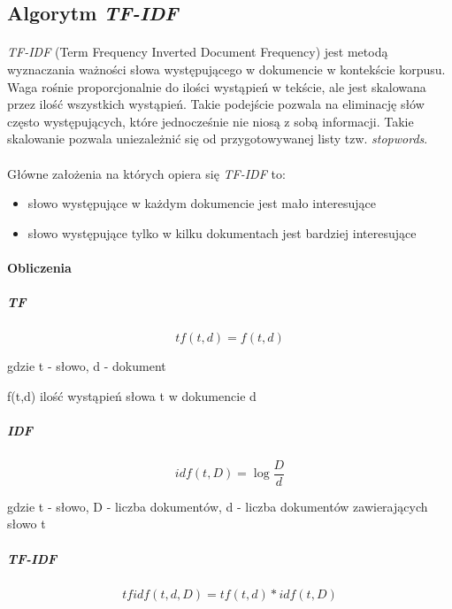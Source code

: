 \documentclass[a4paper,12pt]{article}
\begin{document}
\subsection{Algorytm \textit{TF-IDF}}

\paragraph{}

\textit{TF-IDF} (Term Frequency Inverted Document Frequency) jest metodą wyznaczania ważności słowa występującego w dokumencie w kontekście korpusu. Waga rośnie proporcjonalnie do ilości wystąpień w tekście, ale jest skalowana przez ilość wszystkich wystąpień. Takie podejście pozwala na eliminację słów często występujących, które jednocześnie nie niosą z sobą informacji. Takie skalowanie pozwala uniezależnić się od przygotowywanej listy tzw. \textit{stopwords}.

\paragraph{}
Główne założenia na których opiera się \textit{TF-IDF} to:

\begin{itemize}
 \item słowo występujące w każdym dokumencie jest mało interesujące
 \item słowo występujące tylko w kilku dokumentach jest bardziej interesujące
\end{itemize}

\paragraph{Obliczenia} 

\subparagraph{TF}
\begin{equation}
  tf(t,d)=f(t,d)  
\end{equation}

gdzie t - słowo,  
d - dokument

f(t,d) ilość wystąpień słowa t w dokumencie d

\subparagraph{IDF}
\begin{equation}
idf(t,D)=\log \frac{D}{d}
\end{equation}

gdzie t - słowo, D - liczba dokumentów, d - liczba dokumentów zawierających słowo t

\subparagraph{TF-IDF}
  
\begin{equation}
tfidf(t,d,D)=tf(t,d)*idf(t,D)
\end{equation}
\end{document}
